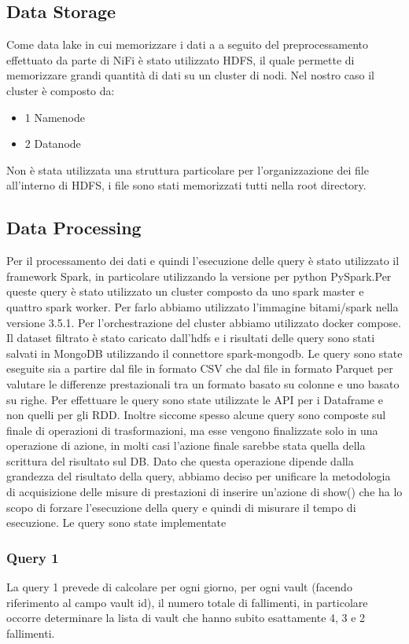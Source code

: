 \documentclass[conference]{IEEEtran}
\begin{document}
\subsection{Data Storage}
Come data lake in cui memorizzare i dati a a seguito del preprocessamento effettuato da parte di NiFi è stato utilizzato HDFS, il quale permette di memorizzare grandi quantità di dati su un cluster di nodi. Nel nostro caso il cluster è composto da:
\begin{itemize}
    \item 1 Namenode
    \item 2 Datanode
\end{itemize}
Non è stata utilizzata una struttura particolare per l'organizzazione dei file all'interno di HDFS, i file sono stati memorizzati tutti nella root directory.
\subsection{Data Processing}
Per il processamento dei dati e quindi l'esecuzione delle query è stato utilizzato il framework Spark, in particolare utilizzando la versione per python PySpark.Per queste query è stato utilizzato un cluster composto da uno spark master e quattro spark worker. Per farlo abbiamo utilizzato l'immagine bitami/spark nella versione 3.5.1. Per l'orchestrazione del cluster abbiamo utilizzato docker compose.
Il dataset filtrato è stato caricato dall'hdfs e i risultati delle query sono stati salvati in MongoDB utilizzando il connettore spark-mongodb.
Le query sono state eseguite sia a partire dal file in formato CSV che dal file in formato Parquet per valutare le differenze prestazionali tra un formato basato su colonne e uno basato su righe.
Per effettuare le query sono state utilizzate le API per i Dataframe e non quelli per gli RDD. 
Inoltre siccome spesso alcune query sono composte sul finale di operazioni di trasformazioni, ma esse vengono finalizzate solo in una operazione di azione, in molti casi l'azione finale sarebbe stata quella della scrittura del risultato sul DB. Dato che questa operazione dipende dalla grandezza del risultato della query, abbiamo deciso per unificare la metodologia di acquisizione delle misure di prestazioni di inserire un'azione di show() che ha lo scopo di forzare l'esecuzione della query e quindi di misurare il tempo di esecuzione.
Le query sono state implementate 
\subsubsection{Query 1}
La query 1 prevede di calcolare per ogni giorno, per ogni vault (facendo riferimento al campo vault id), il numero totale di fallimenti, in particolare occorre determinare la lista di vault che hanno subito esattamente 4, 3 e 2 fallimenti.
\end{document}
